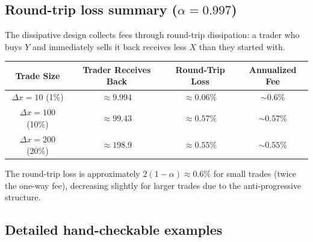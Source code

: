 \documentclass[11pt]{article}
\theoremstyle{definition}
\theoremstyle{remark}
\newcommand{\dx}{\Delta x}
\begin{document}
\subsection{Round-trip loss summary ($\alpha=0.997$)}

The dissipative design collects fees through round-trip dissipation: a trader who buys $Y$ and immediately sells it back receives less $X$ than they started with.

\begin{center}
\begin{tabular}{@{}cccc@{}}
\toprule
\textbf{Trade Size} & \textbf{Trader Receives Back} & \textbf{Round-Trip Loss} & \textbf{Annualized Fee} \\
\midrule
$\dx=10$ (1\%) & $\approx 9.994$ & $\approx 0.06\%$ & $\sim\!0.6\%$ \\
$\dx=100$ (10\%) & $\approx 99.43$ & $\approx 0.57\%$ & $\sim\!0.57\%$ \\
$\dx=200$ (20\%) & $\approx 198.9$ & $\approx 0.55\%$ & $\sim\!0.55\%$ \\
\bottomrule
\end{tabular}
\end{center}

The round-trip loss is approximately $2(1-\alpha)\approx 0.6\%$ for small trades (twice the one-way fee), decreasing slightly for larger trades due to the anti-progressive structure.

\subsection{Detailed hand-checkable examples}
\end{document}
